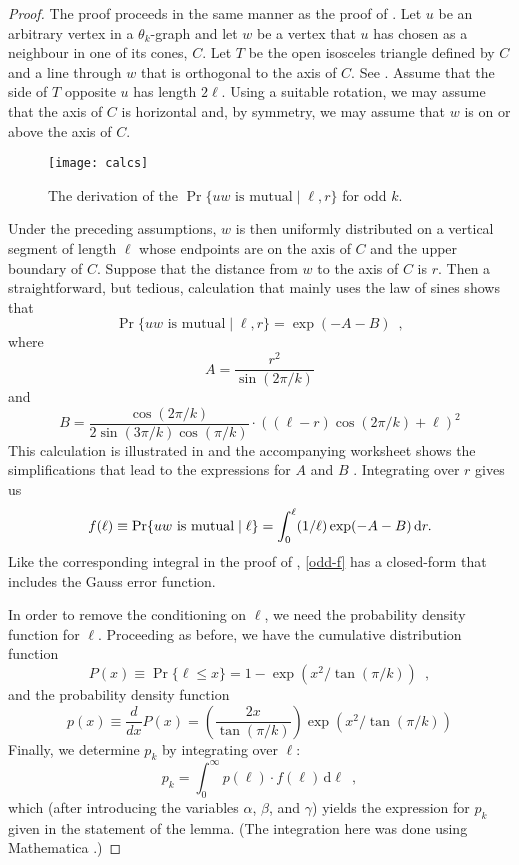 \documentclass{patmorin}
\begin{document}
\begin{proof}
  The proof proceeds in the same manner as the proof of .
  Let $u$ be an arbitrary vertex in a $\theta_k$-graph and let $w$ be
  a vertex that $u$ has chosen as a neighbour in one of its cones, $C$.
  Let $T$ be the open isosceles triangle defined by $C$ and a line through
  $w$ that is orthogonal to the axis of $C$. See .
  Assume that the side of $T$ opposite $u$ has length $2\ell$.  Using a
  suitable rotation, we may assume that the axis of $C$ is horizontal and,
  by symmetry, we may assume that $w$ is on or above the axis of $C$.
 
  \begin{figure}
    \texttt{[image: calcs]}
    \caption{The derivation of the $\Pr\{\mbox{$uw$ is mutual}\mid \ell,r\}$
             for odd $k$.}
  \end{figure}
  Under the preceding assumptions, $w$ is then uniformly distributed on
  a vertical segment of length $\ell$ whose endpoints are on the axis
  of $C$ and the upper boundary of $C$.  Suppose that the distance from
  $w$ to the axis of $C$ is $r$.  Then a straightforward, but tedious,
  calculation that mainly uses the law of sines shows that
  \[
      \Pr\{\mbox{$uw$ is mutual}\mid \ell, r\} = \exp(-A-B) \enspace ,
  \]
  where
  \[ 
      A = \frac{r^2}{\sin(2\pi/k)}
  \]
  and
  \[
      B = \frac{\cos(2\pi/k)}{2\sin(3\pi/k)\cos(\pi/k)}\cdot\left((\ell-r)\cos(2\pi/k)+\ell\right)^2
  \]
  This calculation is illustrated in  and the
  accompanying worksheet shows the simplifications that lead to the
  expressions for $A$ and $B$ \cite{morin:avgtheta}.  Integrating over $r$ gives us
  \begin{equation}
    f(\ell)\equiv \Pr\{\mbox{$uw$ is mutual}\mid \ell\} = 
      \int_0^\ell (1/\ell)\exp(-A-B)\,\mathrm{d}r . \eqlabel{odd-f}
  \end{equation}
  Like the corresponding integral in the proof of ,
  \eqref{odd-f} has a closed-form that includes the Gauss error function.

  In order to remove the conditioning on $\ell$, we need the probability
  density function for $\ell$.  Proceeding as before, we have the
  cumulative distribution function
  \[
     P(x) \equiv \Pr\{\ell\le x\} 
          = 1 - \exp(x^2/\tan(\pi/k)) \enspace ,
  \]
  and the probability density function
  \[
    p(x)\equiv \frac{d}{dx}P(x) = 
     \left(\frac{2x}{\tan(\pi/k)}\right)
      \exp(x^2/\tan(\pi/k))
  \]
  Finally, we determine $p_k$ by integrating over $\ell$:
  \[
     p_k = \int_0^\infty p(\ell)\cdot f(\ell)\, \mathrm{d}{\ell} \enspace ,
  \]
  which (after introducing the variables $\alpha$, $\beta$, and $\gamma$)
  yields the expression for $p_k$ given in the statement of the lemma.
  (The integration here was done using Mathematica \cite{morin:avgtheta}.)
\end{proof}
\end{document}
